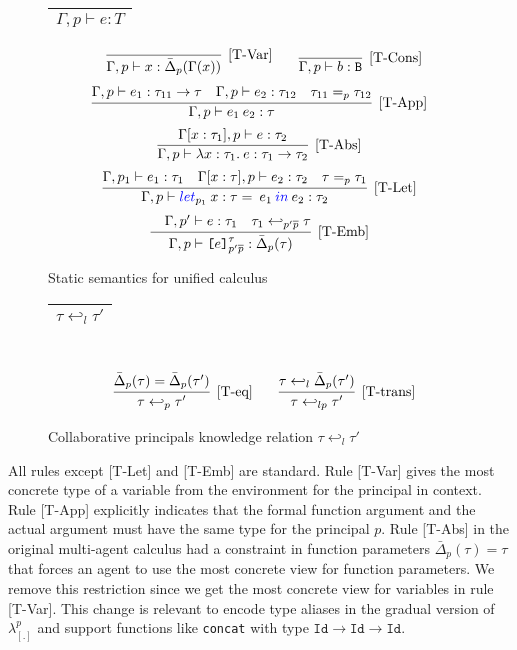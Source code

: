 \documentclass{article}
\newcommand{\emb}[3]{\texttt{[}#1\texttt{]}_{#2}^{#3}}
\newcommand{\tslam}[3]{\lambda #1 : #2. \: #3}
\newcommand{\plet}[5]{\textcolor[rgb]{0,0,1}{let}_{#1} \: {#2}:{#3} = \: #4 \: \textcolor[rgb]{0,0,1}{in} \: #5}
\newcommand\icode[1]{\texttt{#1}}
\newcommand\rulename[1]{\mathrm{\text{[#1]}}}
\newcommand\irname[1]{[#1]}
\newcommand\newcalculus[0]{$\lambda^p_{\left[.\right]}$}
\begin{document}
\begin{figure}[!htbp]
\begin{tabular}{ |c| } 
 \hline
 $\Gamma, p \vdash e : T$  \\
 \hline
\end{tabular}
\[
\renewcommand{\arraystretch}{1.2}
\begin{tabular}{c c} 
\infer[\rulename{T-Var}] 
{\Gamma , p \vdash x : \bar{\Delta}_p(\Gamma(x))}{} & 
\infer[\rulename{T-Cons}] 
{\Gamma, p \vdash b : \texttt{B}}{} \\
\end{tabular}
\]
\[
\infer[\rulename{T-App}] 
{\Gamma, p \vdash e_1 \: e_2 : \tau }{\Gamma, p \vdash e_1 : \tau_{11} \rightarrow \tau \quad \Gamma, p \vdash e_2: \tau_{12} \quad \tau_{11} =_p \tau_{12}}
\]
\[
\infer[\rulename{T-Abs}] 
{\Gamma, p \vdash \tslam{x}{\tau_1}{e} : \tau_1 \rightarrow \tau_2}
{\Gamma [x : \tau_1], p \vdash e : \tau_2 } 
\]
\[
\infer[\rulename{T-Let}] 
{\Gamma, p \vdash \plet{p_1}{x}{\tau}{e_1}{e_2} : \tau_2}
{\Gamma, p_1  \vdash e_1 : \tau_1 \quad \Gamma [x:\tau], p \vdash e_2: \tau_2 \quad \tau =_p \tau_1 }  
\]
\[
\infer[\rulename{T-Emb}] 
{\Gamma, p \vdash \emb{e}{p'\overline{p}}{\tau} : \bar{\Delta}_{p}(\tau)}
{\quad \Gamma, p'  \vdash e : \tau_1 \quad  \tau_1 \hookleftarrow_{p'\overline{p}}  \tau  } 
\]
\caption{Static semantics for unified calculus}
		\label{fig:unified_type-rules_multi-agent}
	\end{figure}	
	
\begin{figure}[!htbp]
\begin{tabular}{ |c| } 
 \hline
 $ \tau \hookleftarrow_l \tau'$  \\
 \hline
\end{tabular} \\
\[
\begin{tabular}{c c} 
\infer[\rulename{T-eq}] 
{\tau \hookleftarrow_p \tau'}{\bar{\Delta}_p(\tau) = \bar{\Delta}_p(\tau')} & 
\infer[\rulename{T-trans}] 
{\tau \hookleftarrow_{lp} \tau'}
{\tau \hookleftarrow_l \bar{\Delta}_p(\tau') } \\
\end{tabular}
\]
\caption{Collaborative principals knowledge relation $\tau \hookleftarrow_l \tau'$}
		\label{fig:unified_type-relation_transitive_equality}
	\end{figure} 
	
	All rules except \irname{T-Let} and \irname{T-Emb} are standard. Rule \irname{T-Var} gives the most concrete type of a variable from the environment for the principal in context. Rule \irname{T-App} explicitly  indicates that the formal function argument and the actual argument must have the same type for the principal $p$. Rule \irname{T-Abs} in the original multi-agent calculus had a constraint in function parameters $\bar{\Delta}_p(\tau) = \tau$ that forces an agent to use the most concrete view for function parameters. We remove this restriction since we get the most concrete view for variables in rule [T-Var]. This change is relevant to encode type aliases in the gradual version of \newcalculus{} and support functions like \icode{concat} with type $\icode{Id} \rightarrow \icode{Id} \rightarrow \icode{Id}$.
\end{document}
